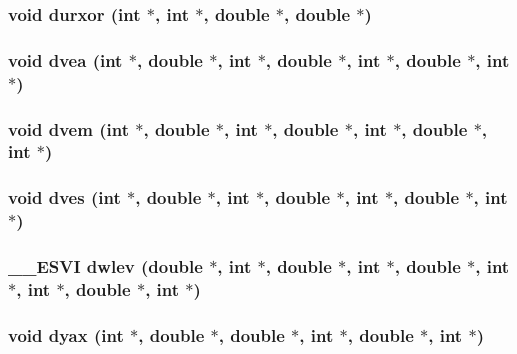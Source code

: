 \subsubsection{\setlength{\rightskip}{0pt plus 5cm}void durxor (int $\ast$, int $\ast$, double $\ast$, double $\ast$)}\label{essl_8h_08e570109750998b443a4cec7a43e9ab}


\subsubsection{\setlength{\rightskip}{0pt plus 5cm}void dvea (int $\ast$, double $\ast$, int $\ast$, double $\ast$, int $\ast$, double $\ast$, int $\ast$)}\label{essl_8h_817037be6ef6297e6d64d8b3fe951de1}


\subsubsection{\setlength{\rightskip}{0pt plus 5cm}void dvem (int $\ast$, double $\ast$, int $\ast$, double $\ast$, int $\ast$, double $\ast$, int $\ast$)}\label{essl_8h_0de636cf2071940fdc092e99607f28f4}


\subsubsection{\setlength{\rightskip}{0pt plus 5cm}void dves (int $\ast$, double $\ast$, int $\ast$, double $\ast$, int $\ast$, double $\ast$, int $\ast$)}\label{essl_8h_230ccbdffd318742eef1227e3ea757b6}


\subsubsection{\setlength{\rightskip}{0pt plus 5cm}\_\-\_\-ESVI dwlev (double $\ast$, int $\ast$, double $\ast$, int $\ast$, double $\ast$, int $\ast$, int $\ast$, double $\ast$, int $\ast$)}\label{essl_8h_42b3d355b70a55c4bf5941dc1d7ac952}


\subsubsection{\setlength{\rightskip}{0pt plus 5cm}void dyax (int $\ast$, double $\ast$, double $\ast$, int $\ast$, double $\ast$, int $\ast$)}\label{essl_8h_123e8c05bb08ca6b2b8864d5e456531b}


